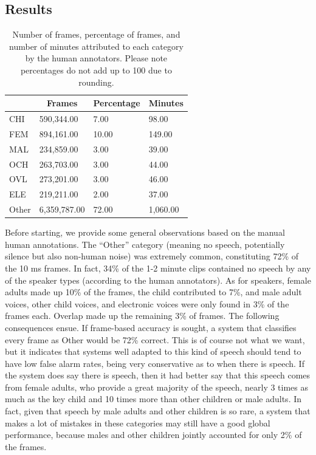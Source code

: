 \documentclass[english,table,man,floatsintext]{apa6}
\begin{document}
\subsection{Results}\label{results}

\begin{table}[tbp]

\begin{center}
\begin{threeparttable}

\caption{\label{tab:tabprops}Number of frames, percentage of frames, and number of minutes attributed to each category by the human annotators. Please note percentages do not add up to 100 due to rounding.}

\begin{tabular}{llll}
\toprule
 & \multicolumn{1}{c}{Frames} & \multicolumn{1}{c}{Percentage} & \multicolumn{1}{c}{Minutes}\\
\midrule
CHI & 590,344.00 & 7.00 & 98.00\\
FEM & 894,161.00 & 10.00 & 149.00\\
MAL & 234,859.00 & 3.00 & 39.00\\
OCH & 263,703.00 & 3.00 & 44.00\\
OVL & 273,201.00 & 3.00 & 46.00\\
ELE & 219,211.00 & 2.00 & 37.00\\
Other & 6,359,787.00 & 72.00 & 1,060.00\\
\bottomrule
\end{tabular}

\end{threeparttable}
\end{center}

\end{table}

Before starting, we provide some general observations based on the
manual human annotations. The \enquote{Other} category (meaning no
speech, potentially silence but also non-human noise) was extremely
common, constituting 72\% of the 10 ms frames. In fact, 34\% of the 1-2
minute clips contained no speech by any of the speaker types (according
to the human annotators). As for speakers, female adults made up 10\% of
the frames, the child contributed to 7\%, and male adult voices, other
child voices, and electronic voices were only found in 3\% of the frames
each. Overlap made up the remaining 3\% of frames. The following
consequences ensue. If frame-based accuracy is sought, a system that
classifies every frame as Other would be 72\% correct. This is of course
not what we want, but it indicates that systems well adapted to this
kind of speech should tend to have low false alarm rates, being very
conservative as to when there is speech. If the system does say there is
speech, then it had better say that this speech comes from female
adults, who provide a great majority of the speech, nearly 3 times as
much as the key child and 10 times more than other children or male
adults. In fact, given that speech by male adults and other children is
so rare, a system that makes a lot of mistakes in these categories may
still have a good global performance, because males and other children
jointly accounted for only 2\% of the frames.
\end{document}
